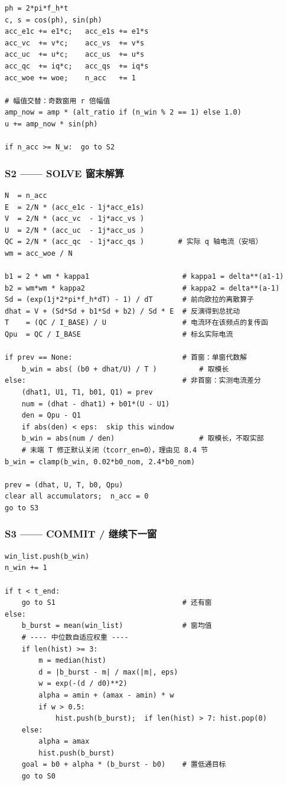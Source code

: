 \documentclass[11pt,a4paper]{ctexart}
\begin{document}
\begin{verbatim}
ph = 2*pi*f_h*t
c, s = cos(ph), sin(ph)
acc_e1c += e1*c;   acc_e1s += e1*s
acc_vc  += v*c;    acc_vs  += v*s
acc_uc  += u*c;    acc_us  += u*s
acc_qc  += iq*c;   acc_qs  += iq*s
acc_woe += woe;    n_acc   += 1

# 幅值交替：奇数窗用 r 倍幅值
amp_now = amp * (alt_ratio if (n_win % 2 == 1) else 1.0)
u += amp_now * sin(ph)

if n_acc >= N_w:  go to S2
\end{verbatim}

\subsubsection*{S2 —— SOLVE 窗末解算}

\begin{verbatim}
N  = n_acc
E  = 2/N * (acc_e1c - 1j*acc_e1s)
V  = 2/N * (acc_vc  - 1j*acc_vs )
U  = 2/N * (acc_uc  - 1j*acc_us )
QC = 2/N * (acc_qc  - 1j*acc_qs )        # 实际 q 轴电流（安培）
wm = acc_woe / N

b1 = 2 * wm * kappa1                      # kappa1 = delta**(a1-1)
b2 = wm*wm * kappa2                       # kappa2 = delta**(a-1)
Sd = (exp(1j*2*pi*f_h*dT) - 1) / dT       # 前向欧拉的离散算子
dhat = V + (Sd*Sd + b1*Sd + b2) / Sd * E  # 反演得到总扰动
T    = (QC / I_BASE) / U                  # 电流环在该频点的复传函
Qpu  = QC / I_BASE                        # 标幺实际电流

if prev == None:                          # 首窗：单窗代数解
    b_win = abs( (b0 + dhat/U) / T )          # 取模长
else:                                     # 非首窗：实测电流差分
    (dhat1, U1, T1, b01, Q1) = prev
    num = (dhat - dhat1) + b01*(U - U1)
    den = Qpu - Q1
    if abs(den) < eps:  skip this window
    b_win = abs(num / den)                    # 取模长，不取实部
    # 末端 T 修正默认关闭（tcorr_en=0），理由见 8.4 节
b_win = clamp(b_win, 0.02*b0_nom, 2.4*b0_nom)

prev = (dhat, U, T, b0, Qpu)
clear all accumulators;  n_acc = 0
go to S3
\end{verbatim}

\subsubsection*{S3 —— COMMIT / 继续下一窗}

\begin{verbatim}
win_list.push(b_win)
n_win += 1

if t < t_end:
    go to S1                              # 还有窗
else:
    b_burst = mean(win_list)              # 窗均值
    # ---- 中位数自适应权重 ----
    if len(hist) >= 3:
        m = median(hist)
        d = |b_burst - m| / max(|m|, eps)
        w = exp(-(d / d0)**2)
        alpha = amin + (amax - amin) * w
        if w > 0.5:
            hist.push(b_burst);  if len(hist) > 7: hist.pop(0)
    else:
        alpha = amax
        hist.push(b_burst)
    goal = b0 + alpha * (b_burst - b0)    # 置低通目标
    go to S0
\end{verbatim}
\end{document}
